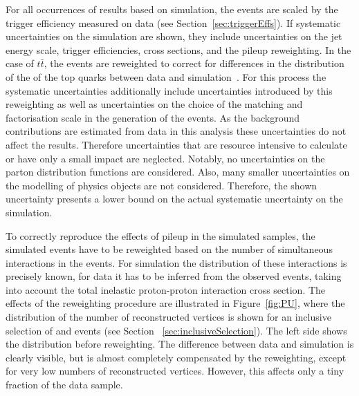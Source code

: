 For all occurrences of results based on simulation, the events are scaled by the trigger efficiency measured on data (see Section~\ref{sec:triggerEffs}). If systematic uncertainties on the simulation are shown, they include uncertainties on the jet energy scale, trigger efficiencies, cross sections, and the pileup reweighting. In the case of $t\bar{t}$, the events are reweighted to correct for differences in the distribution of the \pt of the top quarks between data and simulation~\cite{TopReweighting}. For this process the systematic uncertainties additionally include uncertainties introduced by this reweighting as well as uncertainties on the choice of the matching and factorisation scale in the generation of the events. As the background contributions are estimated from data in this analysis these uncertainties do not affect the results. Therefore uncertainties that are resource intensive to calculate or have only a small impact are neglected. Notably, no uncertainties on the parton distribution functions are considered. Also, many smaller uncertainties on the modelling of physics objects are not considered. Therefore, the shown uncertainty presents a lower bound on the actual systematic uncertainty on the simulation. 

To correctly reproduce the effects of pileup in the simulated samples, the simulated events have to be reweighted based on the number of simultaneous interactions in the events. For simulation the distribution of these interactions is precisely known, for data it has to be inferred from the observed events, taking into account the total inelastic proton-proton interaction cross section. The effects of the reweighting procedure are illustrated in Figure~\ref{fig:PU}, where the distribution of the number of reconstructed vertices is shown for an inclusive selection of \EE and \MM events (see Section ~\ref{sec:inclusiveSelection}). The left side shows the distribution before reweighting. The difference between data and simulation is clearly visible, but is almost completely compensated by the reweighting, except for very low numbers of reconstructed vertices. However, this affects only a tiny fraction of the data sample.

